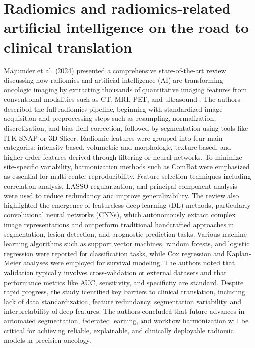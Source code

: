\section{Radiomics and radiomics-related artificial intelligence on the road to clinical translation}

Majumder et al. (2024) presented a comprehensive state-of-the-art review discussing how radiomics and artificial intelligence (AI) are transforming oncologic imaging by extracting thousands of quantitative imaging features from conventional modalities such as CT, MRI, PET, and ultrasound \cite{Majumder2024-tzad004}. The authors described the full radiomics pipeline, beginning with standardized image acquisition and preprocessing steps such as resampling, normalization, discretization, and bias field correction, followed by segmentation using tools like ITK-SNAP or 3D Slicer. Radiomic features were grouped into four main categories: intensity-based, volumetric and morphologic, texture-based, and higher-order features derived through filtering or neural networks. To minimize site-specific variability, harmonization methods such as ComBat were emphasized as essential for multi-center reproducibility. Feature selection techniques including correlation analysis, LASSO regularization, and principal component analysis were used to reduce redundancy and improve generalizability. The review also highlighted the emergence of featureless deep learning (DL) methods, particularly convolutional neural networks (CNNs), which autonomously extract complex image representations and outperform traditional handcrafted approaches in segmentation, lesion detection, and prognostic prediction tasks. Various machine learning algorithms such as support vector machines, random forests, and logistic regression were reported for classification tasks, while Cox regression and Kaplan-Meier analyses were employed for survival modeling. The authors noted that validation typically involves cross-validation or external datasets and that performance metrics like AUC, sensitivity, and specificity are standard. Despite rapid progress, the study identified key barriers to clinical translation, including lack of data standardization, feature redundancy, segmentation variability, and interpretability of deep features. The authors concluded that future advances in automated segmentation, federated learning, and workflow harmonization will be critical for achieving reliable, explainable, and clinically deployable radiomic models in precision oncology.
